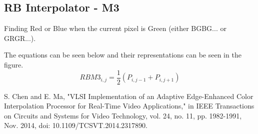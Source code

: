 \documentclass{article}
\begin{document}
\subsection{RB Interpolator - M3}
Finding Red or Blue when the current pixel is Green (either BGBG... or GRGR...).

The equations can be seen below and their representations can be seen in the figure.
    {
        \begin{equation}
            RBM3_{i,j} = \frac{1}{2}(P_{i,j-1} + P_{i,j+1})
        \end{equation}
    }



\begin{thebibliography}{9}
    S. Chen and E. Ma, "VLSI Implementation of an Adaptive Edge-Enhanced Color Interpolation Processor for Real-Time Video Applications," in IEEE Transactions on Circuits and Systems for Video Technology, vol. 24, no. 11, pp. 1982-1991, Nov. 2014, doi: 10.1109/TCSVT.2014.2317890.

\end{thebibliography}
\end{document}
